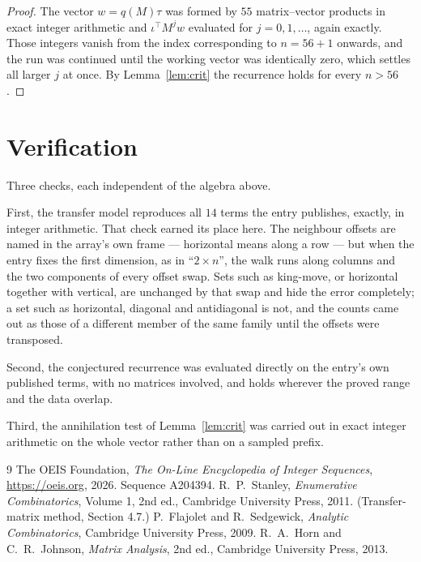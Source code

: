 \documentclass[11pt,a4paper]{article}
\theoremstyle{plain}
\theoremstyle{definition}
\begin{document}
\begin{proof}
The vector $w=q(M)\tau$ was formed by $55$ matrix--vector products in exact integer
arithmetic and $\iota^{\!\top}M^{j}w$ evaluated for $j=0,1,\dots$, again exactly. Those
integers vanish from the index corresponding to $n=56+1$ onwards, and the run was
continued until the working vector was identically zero, which settles all larger $j$ at once.
By Lemma~\ref{lem:crit} the recurrence holds for every $n>56$.
\end{proof}

\section{Verification}

Three checks, each independent of the algebra above.

First, the transfer model reproduces all $14$ terms the entry publishes, exactly, in
integer arithmetic. That check earned its place here. The neighbour offsets are named in the
array's own frame --- horizontal means along a row --- but when the entry fixes the first
dimension, as in ``$2\times n$'', the walk runs along columns and the two components of every
offset swap. Sets such as king-move, or horizontal together with vertical, are unchanged by
that swap and hide the error completely; a set such as horizontal, diagonal and antidiagonal
is not, and the counts came out as those of a different member of the same family until the
offsets were transposed.

Second, the conjectured recurrence was evaluated directly on the entry's own published terms,
with no matrices involved, and holds wherever the proved range and the data overlap.

Third, the annihilation test of Lemma~\ref{lem:crit} was carried out in exact integer
arithmetic on the whole vector rather than on a sampled prefix.

\begin{thebibliography}{9}
 The OEIS Foundation, \emph{The On-Line Encyclopedia of Integer
Sequences}, \url{https://oeis.org}, 2026. Sequence A204394.
 R.~P.~Stanley, \emph{Enumerative Combinatorics}, Volume 1, 2nd ed.,
Cambridge University Press, 2011. (Transfer-matrix method, Section 4.7.)
 P.~Flajolet and R.~Sedgewick, \emph{Analytic Combinatorics}, Cambridge
University Press, 2009.
 R.~A.~Horn and C.~R.~Johnson, \emph{Matrix Analysis}, 2nd ed., Cambridge
University Press, 2013.
\end{thebibliography}
\end{document}
